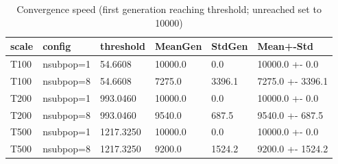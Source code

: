 \begin{table}[htbp]
\centering
\caption{Convergence speed (first generation reaching threshold; unreached set to 10000)}
\label{tab:nsubpop_convergence}
\begin{tabular}{llllll}
\toprule
scale & config & threshold & MeanGen & StdGen & Mean+-Std \\
\midrule
T100 & nsubpop=1 & 54.6608 & 10000.0 & 0.0 & 10000.0 +- 0.0 \\
T100 & nsubpop=8 & 54.6608 & 7275.0 & 3396.1 & 7275.0 +- 3396.1 \\
T200 & nsubpop=1 & 993.0460 & 10000.0 & 0.0 & 10000.0 +- 0.0 \\
T200 & nsubpop=8 & 993.0460 & 9540.0 & 687.5 & 9540.0 +- 687.5 \\
T500 & nsubpop=1 & 1217.3250 & 10000.0 & 0.0 & 10000.0 +- 0.0 \\
T500 & nsubpop=8 & 1217.3250 & 9200.0 & 1524.2 & 9200.0 +- 1524.2 \\
\bottomrule
\end{tabular}
\end{table}
